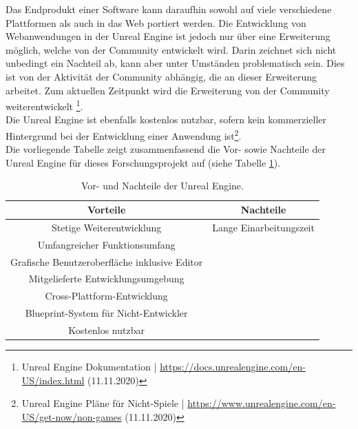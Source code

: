 \documentclass[a4paper,12pt,oneside]{article}
\begin{document}
        Das Endprodukt einer Software kann daraufhin sowohl auf viele verschiedene Plattformen 
        als auch in das Web portiert werden. Die Entwicklung von Webanwendungen
        in der Unreal Engine ist jedoch nur über eine Erweiterung möglich, welche von 
        der Community entwickelt wird. Darin zeichnet sich nicht unbedingt ein Nachteil ab, 
        kann aber unter Umständen problematisch sein. Dies ist von der Aktivität 
        der Community abhängig, die an dieser Erweiterung arbeitet. Zum aktuellen
        Zeitpunkt wird die Erweiterung von der Community weiterentwickelt
        \footnote{Unreal Engine Dokumentation | \url{https://docs.unrealengine.com/en-US/index.html} (11.11.2020)}.
        \\
        Die Unreal Engine ist ebenfalls kostenlos nutzbar, sofern kein kommerzieller
        Hintergrund bei der Entwicklung einer Anwendung ist\footnote{Unreal Engine Pläne für Nicht-Spiele | \url{https://www.unrealengine.com/en-US/get-now/non-games} (11.11.2020)}.
        \\
        Die vorliegende Tabelle zeigt zusammenfassend die Vor- sowie Nachteile der Unreal
        Engine für dieses Forschungsprojekt auf (siehe Tabelle \ref{tab:vor-und-nachteile-unreal}).
        \begin{table}[h]
          \begin{center}
            \begin{tabular}{| c | c |}
              \hline
              \textbf{Vorteile} & \textbf{Nachteile} \\ \hline
              Stetige Weiterentwicklung & Lange Einarbeitungszeit \\ \hline
              Umfangreicher Funktionsumfang & \\ \hline
              Grafische Benutzeroberfläche inklusive Editor & \\ \hline
              Mitgelieferte Entwicklungsumgebung & \\ \hline
              Cross-Plattform-Entwicklung & \\ \hline
              Blueprint-System für Nicht-Entwickler & \\ \hline
              Kostenlos nutzbar & \\
              \hline
            \end{tabular}
            \caption{Vor- und Nachteile der Unreal Engine.\label{tab:vor-und-nachteile-unreal}}
          \end{center}
        \end{table}
\end{document}
